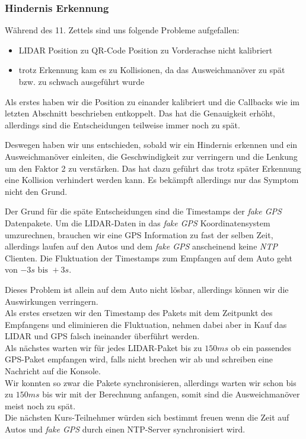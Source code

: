 \documentclass[10pt,oneside,a4paper]{article}
\begin{document}
      \subsubsection{Hindernis Erkennung}
        W\"ahrend des 11. Zettels sind uns folgende Probleme aufgefallen:
        \begin{itemize}
          \item LIDAR Position zu QR-Code Position zu Vorderachse nicht kalibriert
          \item trotz Erkennung kam es zu Kollisionen, da das Ausweichman\"over zu sp\"at bzw. zu
            schwach ausgef\"uhrt wurde
        \end{itemize}
        Als erstes haben wir die Position zu einander kalibriert und die Callbacks wie im letzten
        Abschnitt beschrieben entkoppelt. Das hat die Genauigkeit erh\"oht, allerdings sind die
        Entscheidungen teilweise immer noch zu sp\"at.

        Deswegen haben wir uns entschieden, sobald wir ein Hindernis erkennen und ein Ausweichman\"over
        einleiten, die Geschwindigkeit zur verringern und die Lenkung um den Faktor 2 zu
        verst\"arken. Das hat dazu gef\"uhrt das trotz sp\"ater Erkennung eine Kollision verhindert
        werden kann. Es bek\"ampft allerdings nur das Symptom nicht den Grund.

        Der Grund f\"ur die sp\"ate Entscheidungen sind die Timestamps der \emph{fake GPS}
        Datenpakete. Um die LIDAR-Daten in das \emph{fake GPS} Koordinatensystem umzurechnen,
        brauchen wir eine GPS Information zu fast der selben Zeit, allerdings laufen auf den Autos
        und dem \emph{fake GPS} anscheinend keine \emph{NTP} Clienten. Die Fluktuation der
        Timestamps zum Empfangen auf dem Auto geht von $- 3s \text{ bis } + 3s$.

        Dieses Problem ist allein auf dem Auto nicht l\"osbar, allerdings k\"onnen wir die
        Auswirkungen verringern.\\
        Als erstes ersetzen wir den Timestamp des Pakets mit dem Zeitpunkt des Empfangens und
        eliminieren die Fluktuation, nehmen dabei aber in Kauf das LIDAR und GPS falsch ineinander
        \"uberf\"uhrt werden.\\
        Als n\"achstes warten wir f\"ur jedes LIDAR-Paket bis zu $150ms$ ob ein passendes GPS-Paket
        empfangen wird, falls nicht brechen wir ab und schreiben eine Nachricht auf die Konsole.\\
        Wir konnten so zwar die Pakete synchronisieren, allerdings warten wir schon bis zu $150ms$
        bis wir mit der Berechnung anfangen, somit sind die Ausweichman\"over meist noch zu sp\"at.\\
        Die n\"achsten Kurs-Teilnehmer w\"urden sich bestimmt freuen wenn die Zeit auf Autos und
        \emph{fake GPS} durch einen NTP-Server synchronisiert wird.
\end{document}
